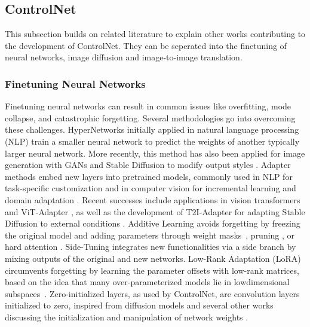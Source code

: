 \subsection{ControlNet}
This subsection builds on related literature \cite{zhang2023addingconditionalcontroltexttoimage} 
to explain other works contributing to the development of ControlNet. They can be seperated into
the finetuning of neural networks, image diffusion and image-to-image translation.

\subsubsection{Finetuning Neural Networks}
Finetuning neural networks can result in common issues like overfitting, mode collapse, and 
catastrophic forgetting. Several methodologies go into overcoming these challenges. 
HyperNetworks initially applied in natural language processing (NLP) train a smaller neural 
network to predict the weights of another typically larger neural network. More recently, 
this method has also been applied for image generation with GANs and Stable Diffusion 
\cite{rombach2022stablediffusion} to modify output styles 
\cite{alaluf2022hyperstylestyleganinversionhypernetworks, dinh2022hyperinverterimprovingstyleganinversion}.
Adapter methods embed new layers into pretrained models, commonly used in NLP for 
task-specific customization \cite{houlsby2019parameterefficienttransferlearningnlp, stickland2019bertpalsprojectedattention}
and in computer vision for incremental learning \cite{rosenfeld2018incrementallearningdeepadaptation} 
and domain adaptation \cite{rebuffi2018efficientparametrizationmultidomaindeep}. 
Recent successes include applications in vision transformers
\cite{li2022exploringplainvisiontransformer, li2021benchmarkingdetectiontransferlearning} 
and ViT-Adapter \cite{chen2023visiontransformeradapterdense}, 
as well as the development of T2I-Adapter for adapting Stable Diffusion to external 
conditions \cite{mou2023t2iadapterlearningadaptersdig}.
Additive Learning avoids forgetting by freezing the original model and 
adding parameters through weight masks~\cite{mallya2018piggybackadaptingsinglenetwork, rosenfeld2018incrementallearningdeepadaptation}, 
pruning \cite{mallya2018packnetaddingmultipletasks}, or hard attention \cite{serrà2018overcomingcatastrophicforgettinghard}. 
Side-Tuning \cite{zhang2020sidetuningbaselinenetworkadaptation} integrates new functionalities 
via a side branch by mixing outputs of the original and new networks. Low-Rank Adaptation 
(LoRA) \cite{hu2021loralowrankadaptationlarge} circumvents forgetting by learning the 
parameter offsets with low-rank matrices, based on the idea that many over-parameterized 
models lie in lowdimensional subspaces~\cite{aghajanyan2020intrinsicdimensionalityexplainseffectiveness, li2018measuringintrinsicdimensionobjective}. 
Zero-initialized layers, as used by ControlNet, are convolution layers initialized to zero, inspired 
from diffusion models and several other works discussing the initialization and manipulation
of network weights \cite{lecun2015deeplearning,rombach2022stablediffusion, karras2018progressivegrowinggansimproved}.

